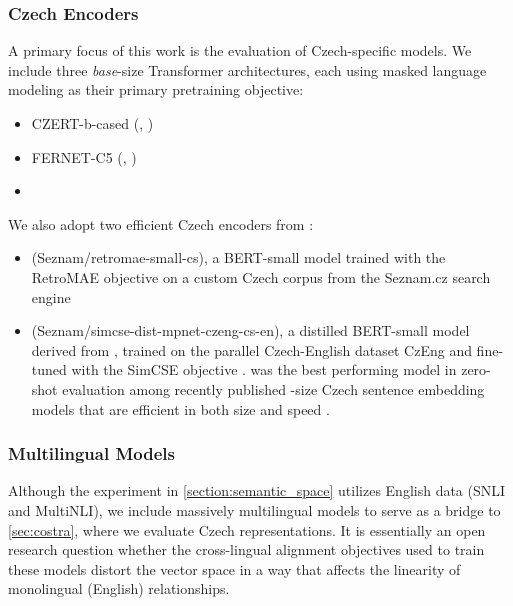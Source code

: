 \subsubsection {Czech Encoders}
A primary focus of this work is the evaluation of Czech-specific models. We include three \emph{base}-size Transformer architectures, each using masked language modeling as their primary pretraining objective:

\begin{itemize}
    \item CZERT-b-cased  (\czert, \citealp{sido2021czert})
    \item FERNET-C5 (\fernet, \citealp{FERNETC5})
    \item \robeczech{} \citep{robeczech}
\end{itemize}

We also adopt two efficient Czech \Small encoders from \cite{bednavr2024some}: 
\begin{itemize}
    \item \retromae{} (Seznam/retromae-small-cs), a BERT-small model trained with the RetroMAE objective on a custom Czech corpus from the Seznam.cz search engine
    \item\simcse{} (Seznam/simcse-dist-mpnet-czeng-cs-en), a dis\-tilled BERT-small model derived from , trained on the parallel Czech-English dataset CzEng \citep{czeng10:lrec2012} and fine-tuned with the SimCSE objective \citep{gao-etal-2021-simcse}. \simcse was the best performing model in zero-shot evaluation among recently published \Small-size Czech sentence embedding models that are efficient in both size and speed \citep{bednavr2024some}. 
\end{itemize}

\subsubsection{Multilingual Models}
Although the experiment in \cref{section:semantic_space} utilizes English data (SNLI and MultiNLI), we include massively multilingual models to serve as a bridge to \cref{sec:costra}, where we evaluate Czech representations. It is essentially an open research question whether the cross-lingual alignment objectives used to train these models distort the vector space in a way that affects the linearity of monolingual (English) relationships.

